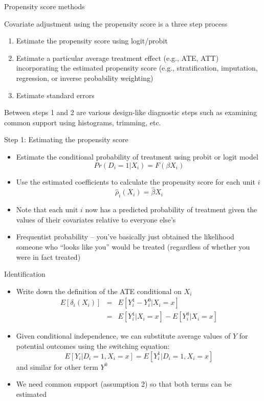 \documentclass{beamer}
\begin{document}
\begin{frame}{Propensity score methods}
	
Covariate adjustment using the propensity score is a three step process	
		\begin{enumerate}
		\item Estimate the propensity score using logit/probit
		\item Estimate a particular average treatment effect (e.g., ATE, ATT) incorporating the estimated propensity score (e.g., stratification, imputation, regression, or inverse probability weighting)
		\item Estimate standard errors
		\end{enumerate}

Between steps 1 and 2 are various design-like diagnostic steps such as examining common support	using histograms, trimming, etc.

\end{frame}

\begin{frame}{Step 1: Estimating the propensity score}

		\begin{itemize}
		\item Estimate the conditional probability of treatment using probit or logit model$$Pr(D_i=1|X_i) = F(\beta X_i)$$
		\item Use the estimated coefficients to calculate the propensity score for each unit $i$$$\widehat{\rho}_i(X_i) = \widehat{\beta} X_i$$
		\item Note that each unit $i$ now has a predicted probability of treatment given the values of their covariates relative to everyone else's 
		\item Frequentist probability -- you've basically just obtained the likelihood someone who ``looks like you'' would be treated (regardless of whether you were in fact treated)
		\end{itemize}
\end{frame}

\begin{frame}{Identification}
	
	\begin{itemize}
	\item Write down the definition of the ATE conditional on $X_i$
		\begin{eqnarray*}
		E[\delta_i(X_i) ]&=& E[Y^1_i - Y^0_i | X_i=x] \\
		&=&E[Y^1_i | X_i=x] - E[Y^0_i | X_i=x]
		\end{eqnarray*}
	\item Given conditional independence, we can substitute average values of $Y$ for potential outcomes using the switching equation: $$E[Y_i | D_i =1, X_i=x]=E[Y_i^1 | D_i=1, X_i=x]$$ and similar for other term $Y^0$
	\item We need common support (assumption 2) so that both terms can be estimated
	\end{itemize}
\end{frame}		
\end{document}
